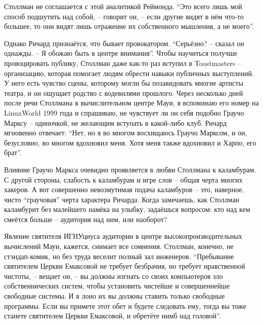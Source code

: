 Столлман не соглашается с этой аналитикой Реймонда. \enquote{Это всего лишь мой способ подшутить над собой, -- говорит он, -- если другие видят в нём что-то большее, то они видят лишь отражение их собственного мышления, а не моего}.

Однако Ричард признаётся, что бывает провокатором. \enquote{Серьёзно? -- сказал он однажды. -- Я обожаю быть в центре внимания}. Чтобы научиться получше провоцировать публику, Столлман даже как-то раз вступил в Toastmasters -- организацию, которая помогает людям обрести навыки публичных выступлений. У него есть чувство сцены, которому могли бы позавидовать многие артисты театра, и он ощущает родство с водевилями прошлого. Через несколько дней после речи Столлмана в вычислительном центре Мауи, я вспоминаю его номер на LinuxWorld 1999 года и спрашиваю, не чувствует ли он себя подобно Граучо Марксу -- одиночкой, не желающим вступать в какой-либо клуб.  Ричард мгновенно отвечает: \enquote{Нет, но я во многом восхищаюсь Граучо Марксом, и он, безусловно, во многом вдохновил меня. Хотя меня также вдохновил и Харпо, его брат}.

Влияние Граучо Маркса очевидно проявляется в любви Столлмана к каламбурам. С другой стороны, слабость к каламбурам и игре слов -- общая черта многих хакеров. А вот совершенно невозмутимая подача каламбуров -- это, наверное, чисто \enquote{граучовая} черта характера Ричарда. Когда замечаешь, как Столлман каламбурит без малейшего намёка на улыбку, задаёшься вопросом: кто над кем смеётся больше -- аудитория над ним, или наоборот?

Явление святителя ИГНУциуса аудитории в центре высокопроизводительных вычислений Мауи, кажется, снимает все сомнения. Столлман, конечно, не стэндап-комик, но без труда веселит полный зал инженеров. \enquote{Пребывание святителем Церкви Емаксовой не требует безбрачия, но требует нравственной чистоты, -- вещает он, -- вы должны изгнать со своих компьютеров зло собственнических систем, чтобы установить чистейше и совершеннейше свободные системы. И в лоно их вы должны ставить только свободные программы. Если вы примете этот обет и будете следовать ему, тогда вы тоже станете святителем Церкви Емаксовой, и обретёте нимб над головой}.

